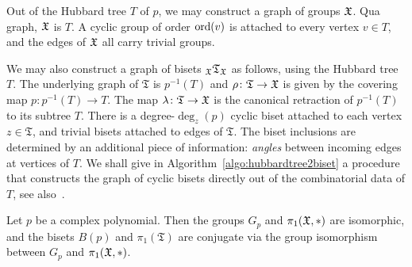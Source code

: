 \documentclass{amsart}
\begin{document}
Out of the Hubbard tree $T$ of $p$, we may construct a graph of groups
${\mathfrak X}$. Qua graph, ${\mathfrak X}$ is $T$. A cyclic group of order $\operatorname{ord}(v)$ is
attached to every vertex $v\in T$, and the edges of ${\mathfrak X}$ all carry
trivial groups.

We may also construct a graph of bisets $\subscript\gf{\mathfrak T}_\gf$ as
follows, using the Hubbard tree $T$.  The underlying graph of
$\mathfrak T$ is $p^{-1}(T)$ and $\rho\colon\mathfrak T\to{\mathfrak X}$ is
given by the covering map $p\colon p^{-1}(T)\to T$. The map
$\lambda\colon\mathfrak T\to{\mathfrak X}$ is  the canonical retraction of
$p^{-1}(T)$ to its subtree $T$. There is a degree-$\deg_z(p)$ cyclic biset
attached to each vertex $z\in\mathfrak T$, and trivial bisets attached
to edges of $\mathfrak T$. The biset inclusions are determined by an
additional piece of information: \emph{angles} between incoming edges
at vertices of $T$. We shall give in
Algorithm~\ref{algo:hubbardtree2biset} a procedure that constructs the
graph of cyclic bisets directly out of the combinatorial data of $T$,
see also~\cite{richter:hubbard}.

\begin{prop}
  Let $p$ be a complex polynomial. Then the groups $G_p$ and
  $\pi_1({\mathfrak X},*)$ are isomorphic, and the bisets $B(p)$ and
  $\pi_1(\mathfrak T)$ are conjugate via the group isomorphism
  between $G_p$ and $\pi_1({\mathfrak X},*)$.
\end{prop}
\end{document}
